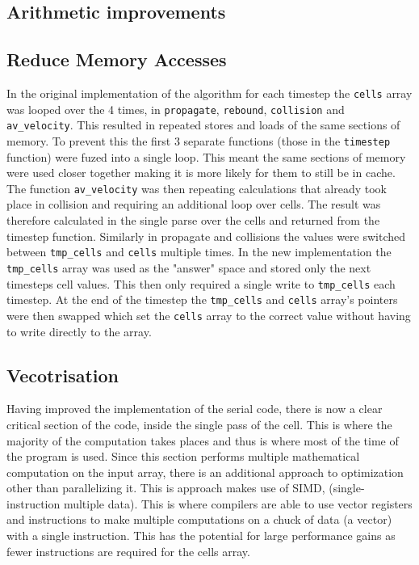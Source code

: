 \documentclass{article}
\begin{document}
\begin{multicols}{2}
\subsection{Arithmetic improvements}

\subsection{Reduce Memory Accesses}

In the original implementation of the algorithm for each timestep the
\verb|cells| array was looped over the 4 times, in \verb|propagate|,
\verb|rebound|, \verb|collision| and \verb|av_velocity|. This resulted in
repeated stores and loads of the same sections of memory. To prevent this the
first 3 separate functions (those in the \verb|timestep| function) were fuzed
into a single loop. This meant the same sections of memory were used closer
together making it is more likely for them to still be in cache. The function
\verb|av_velocity| was then repeating calculations that already took place in
collision and requiring an additional loop over cells. The result was therefore
calculated in the single parse over the cells and returned from the timestep
function. Similarly in propagate and collisions the values were switched
between \verb|tmp_cells| and \verb|cells| multiple times. In the new
implementation the \verb|tmp_cells| array was used as the "answer" space and
stored only the next timesteps cell values. This then only required a single
write to \verb|tmp_cells| each timestep. At the end of the timestep the
\verb|tmp_cells| and \verb|cells| array's pointers were then swapped which set
the \verb|cells| array to the correct value without having to write directly to
the array.

\subsection{Vecotrisation}

Having improved the implementation of the serial code, there is now a clear
critical section of the code, inside the single pass of the cell. This is where
the majority of the computation takes places and thus is where most of the time
of the program is used. Since this section performs multiple mathematical
computation on the input array, there is an additional approach to optimization
other than parallelizing it. This is approach makes use of SIMD,
(single-instruction multiple data). This is where compilers are able to use
vector registers and instructions to make multiple computations on a chuck of
data (a vector) with a single instruction. This has the potential for large
performance gains as fewer instructions are required for the cells array.


\end{multicols}
\end{document}
